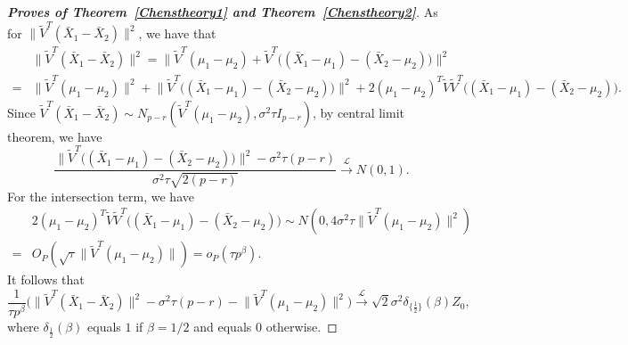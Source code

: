 \documentclass[review]{elsarticle}
\theoremstyle{plain}
\theoremstyle{definition}
\theoremstyle{remark}
\begin{document}
\begin{proof}[\textbf{Proves of Theorem~\ref{Chenstheory1} and Theorem~\ref{Chenstheory2}}]
    As for $\|\tilde{V}^T(\bar{X}_1-\bar{X}_2)\|^2$, we have that
        $$
        \begin{aligned}
            &\|\tilde{V}^T(\bar{X}_1-\bar{X}_2)\|^2
            =\big\|\tilde{V}^T(\mu_1-\mu_2)+\tilde{V}^T\big((\bar{X}_1-\mu_1)-(\bar{X}_2-\mu_2)\big)\big\|^2\\
            =&\|\tilde{V}^T(\mu_1-\mu_2)\|^2+
            \big\|\tilde{V}^T\big((\bar{X}_1-\mu_1)-(\bar{X}_2-\mu_2)\big)\big\|^2+
            2{(\mu_1-\mu_2)}^T\tilde{V}\tilde{V}^T\big((\bar{X}_1-\mu_1)-(\bar{X}_2-\mu_2)\big).
        \end{aligned}
        $$
Since $\tilde{V}^T (\bar{X}_1-\bar{X}_2)\sim N_{p-r}(\tilde{V}^T (\mu_1-\mu_2),  \sigma^2 \tau I_{p-r})$, by central limit theorem, we have
    $$
\frac{
    \big\|\tilde{V}^T\big((\bar{X}_1-\mu_1)-(\bar{X}_2-\mu_2)\big)\big\|^2-\sigma^2 \tau (p-r)}{\sigma^2 \tau\sqrt{2(p-r)}}\xrightarrow{\mathcal{L}} N(0,1).
    $$
    For the intersection term, we have
    \begin{equation*}
        \begin{aligned}
            &2{(\mu_1-\mu_2)}^T\tilde{V}\tilde{V}^T\big((\bar{X}_1-\mu_1)-(\bar{X}_2-\mu_2)\big)
            \sim N(0,4\sigma^2 \tau \|\tilde{V}^T(\mu_1-\mu_2)\|^2)\\
            =& O_P(\sqrt{\tau}\|\tilde{V}^T(\mu_1-\mu_2)\| )=o_P(\tau p^{\beta}).
        \end{aligned}
    \end{equation*}
    It follows that
    \begin{equation}\label{eq:kkk3}
\frac{1}{\tau p^\beta}
    \big(\big\|\tilde{V}^T(\bar{X}_1-\bar{X}_2)\big\|^2-\sigma^2 \tau (p-r)-\big\|\tilde{V}^T(\mu_1-\mu_2)\big\|^2\big)
    \xrightarrow{\mathcal{L}} 
        \sqrt{2}\sigma^2 \delta_{\{\frac{1}{2}\}}(\beta)Z_0,
    \end{equation}
    where $\delta_{\frac{1}{2}}(\beta)$ equals $1$ if $\beta=1/2$ and equals $0$ otherwise.



\end{proof}
\end{document}
